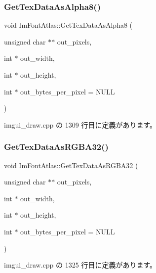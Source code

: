 \subsubsection{\texorpdfstring{Get\+Tex\+Data\+As\+Alpha8()}{GetTexDataAsAlpha8()}}
{\footnotesize\ttfamily void Im\+Font\+Atlas\+::\+Get\+Tex\+Data\+As\+Alpha8 (\begin{DoxyParamCaption}\item[{unsigned char $\ast$$\ast$}]{out\+\_\+pixels,  }\item[{int $\ast$}]{out\+\_\+width,  }\item[{int $\ast$}]{out\+\_\+height,  }\item[{int $\ast$}]{out\+\_\+bytes\+\_\+per\+\_\+pixel = {\ttfamily NULL} }\end{DoxyParamCaption})}



 imgui\+\_\+draw.\+cpp の 1309 行目に定義があります。

\mbox{\label{struct_im_font_atlas_a8abb0c4e67ebb38249d4df71218c4eec}} 
\subsubsection{\texorpdfstring{Get\+Tex\+Data\+As\+R\+G\+B\+A32()}{GetTexDataAsRGBA32()}}
{\footnotesize\ttfamily void Im\+Font\+Atlas\+::\+Get\+Tex\+Data\+As\+R\+G\+B\+A32 (\begin{DoxyParamCaption}\item[{unsigned char $\ast$$\ast$}]{out\+\_\+pixels,  }\item[{int $\ast$}]{out\+\_\+width,  }\item[{int $\ast$}]{out\+\_\+height,  }\item[{int $\ast$}]{out\+\_\+bytes\+\_\+per\+\_\+pixel = {\ttfamily NULL} }\end{DoxyParamCaption})}



 imgui\+\_\+draw.\+cpp の 1325 行目に定義があります。

\mbox{\label{struct_im_font_atlas_a96ffd1956c11dac4f79b43c095828445}} 
